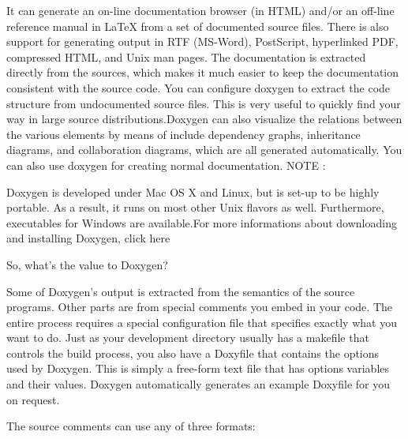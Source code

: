 \documentclass[11pt,utf8]{article}
\begin{document}
It can generate an on-line documentation browser (in HTML) and/or an off-line reference manual in LaTeX from a set of documented source files. There is also support for generating output in RTF (MS-Word), PostScript, hyperlinked PDF, compressed HTML, and Unix man pages. The documentation is extracted directly from the sources, which makes it much easier to keep the documentation consistent with the source code.
You can configure doxygen to extract the code structure from undocumented source files. This is very useful to quickly find your way in large source distributions.Doxygen can also visualize the relations between the various elements by means of include dependency graphs, inheritance diagrams, and collaboration diagrams, which are all generated automatically.
You can also use doxygen for creating normal documentation.
NOTE :

Doxygen is developed under Mac OS X and Linux, but is set-up to be highly portable. As a result, it runs on most other Unix flavors as well. Furthermore, executables for Windows are available.For more informations about downloading and installing Doxygen, click here

So, what's the value to Doxygen?

Some of Doxygen's output is extracted from the semantics of the source programs. Other parts are from special comments you embed in your code. The entire process requires a special configuration file that specifies exactly what you want to do. Just as your development directory usually has a makefile that controls the build process, you also have a Doxyfile that contains the options used by Doxygen. This is simply a free-form text file that has options variables and their values. Doxygen automatically generates an example Doxyfile for you on request.

The source comments can use any of three formats:
\end{document}
